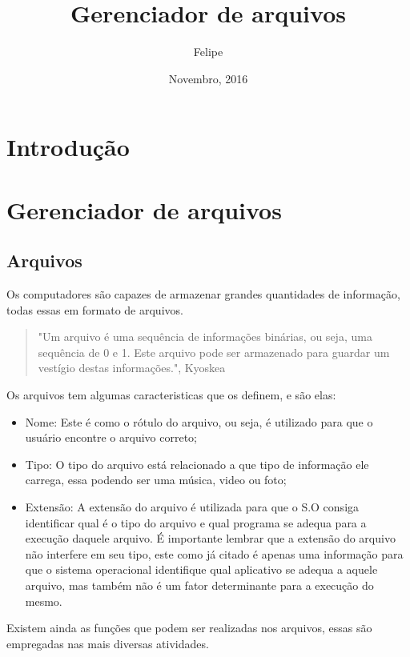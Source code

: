 \documentclass{article}
\title{Gerenciador de arquivos}
\author{Felipe}
\date{Novembro, 2016}
\begin{document}
\maketitle

\section{Introdução}



\section{Gerenciador de arquivos}

\subsection{Arquivos}

Os computadores são capazes de armazenar grandes quantidades de informação, todas essas em formato de arquivos.

 \begin{quote}
"Um arquivo é uma sequência de informações binárias, ou seja, uma sequência de 0 e 1. Este arquivo pode ser armazenado para guardar um vestígio destas informações.", Kyoskea
\end{quote}

Os arquivos tem algumas caracteristicas que os definem, e são elas:

\begin{itemize}

\item Nome: Este é como o rótulo do arquivo, ou seja, é utilizado para que o usuário encontre o arquivo correto;
\item Tipo: O tipo do arquivo está relacionado a que tipo de informação ele carrega, essa podendo ser uma música, video ou foto;
\item Extensão: A extensão do arquivo é utilizada para que o S.O consiga identificar qual é o tipo do arquivo e qual programa se adequa para a execução daquele arquivo. É importante lembrar que a extensão do arquivo não interfere em seu tipo, este como já citado é apenas uma informação para que o sistema operacional identifique qual aplicativo se adequa a aquele arquivo, mas também não é um fator determinante para a execução do mesmo.

\end{itemize}

Existem ainda as funções que podem ser realizadas nos arquivos, essas são empregadas nas mais diversas atividades.
\end{document}
